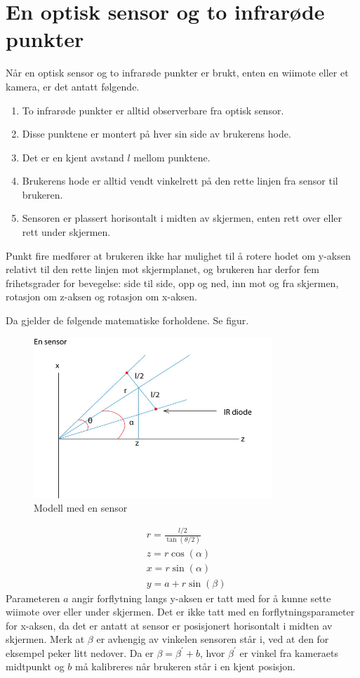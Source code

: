 \documentclass{report}
\begin{document}
\section{En optisk sensor og to infrarøde punkter}
Når en optisk sensor og to infrarøde punkter er brukt, enten en wiimote eller et kamera, er det antatt følgende.
\begin{enumerate}
\item To infrarøde punkter er alltid observerbare fra optisk sensor. 
\item Disse punktene er montert på hver sin side av brukerens hode.
\item Det er en kjent avstand $l$ mellom punktene. 
\item Brukerens hode er alltid vendt vinkelrett på den rette linjen fra sensor til brukeren.
\item Sensoren er plassert horisontalt i midten av skjermen, enten rett over eller rett under skjermen.
\end{enumerate}
Punkt fire medfører at brukeren ikke har mulighet til å rotere hodet om y-aksen relativt til den rette linjen mot skjermplanet, og
brukeren har derfor fem frihetsgrader for bevegelse: side til side, opp og ned, inn mot og fra skjermen, rotasjon om z-aksen og rotasjon om x-aksen.

Da gjelder de følgende matematiske forholdene. Se figur.
	\begin{figure}[h]
	\centering
	\includegraphics[width=0.80\textwidth]{graphics/Figur_en_sensor.jpg}
	\caption{Modell med en sensor}
	\label{fig:En_sensor}
	\end{figure}

\begin{eqnarray}\label{definition}
&r = \frac{l/2}{\tan( \theta/2 )}\\
&z = r \cos( \alpha )\\
&x = r \sin( \alpha )\\
&y = a + r \sin( \beta )
\end{eqnarray}
Parameteren $a$ angir forflytning langs y-aksen er tatt med for å kunne sette wiimote over eller under skjermen.
Det er ikke tatt med en forflytningsparameter for x-aksen, da det er antatt at sensor er posisjonert horisontalt i midten av skjermen.
Merk at $\beta$ er avhengig av vinkelen sensoren står i, ved at den for eksempel peker litt nedover.
Da er $\beta = \beta^\prime + b$, hvor $\beta^\prime$ er vinkel fra kameraets midtpunkt og $b$ må kalibreres når brukeren står i en kjent posisjon.
\end{document}
